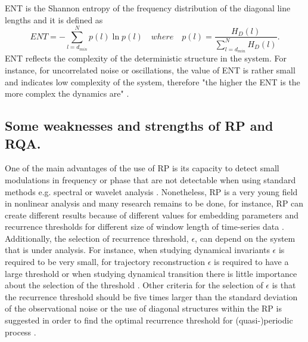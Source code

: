 ENT is the Shannon entropy of the frequency distribution of the diagonal line 
lengths and it is defined as
\begin{equation}
	ENT= - \sum^{N}_{l=d_{min}} p(l) \ln{p(l)} \quad where \quad 
		p(l)=\frac{ H_D(l) }{ \sum^{N}_{ l=d_{min} } H_D(l) }.
\end{equation}
ENT reflects the complexity of the deterministic structure in the system.
For instance, for uncorrelated noise or oscillations, 
the value of ENT is rather small and indicates low complexity of the system,
therefore "the higher the ENT is the more complex the dynamics are" 
\citep[p. 15]{marwan2015}.
%
%
 
\subsection{Some weaknesses and strengths of RP and RQA.} \label{sec:ws_rqa}
One of the main advantages of the use of RP is its capacity to detect 
small modulations in frequency or phase that are not detectable 
when using standard methods e.g. spectral or 
wavelet analysis \citep{marwan2011}.
Nonetheless, RP is a very young field in nonlinear analysis
and many research remains to be done, for instance, 
RP can create different results because of 
different values for embedding parameters and recurrence thresholds
for different size of window length of time-series data 
\citep{marwan2011, eckmann1987}.
Additionally, the selection of recurrence threshold, $\epsilon$, 
can depend on the system that is under analysis. For instance, when studying 
dynamical invariants $\epsilon$ is required to be very small, for trajectory 
reconstruction $\epsilon$ is required to have a large threshold or 
when studying dynamical transition there is little importance about the 
selection of the threshold \citep{marwan2011}. Other criteria for the 
selection of $\epsilon$ is that the recurrence threshold should be five 
times larger than the standard deviation of the observational noise
or the use of diagonal structures within the RP is suggested in order
to find the optimal recurrence threshold for (quasi-)periodic process 
\citep{marwan2011}.

